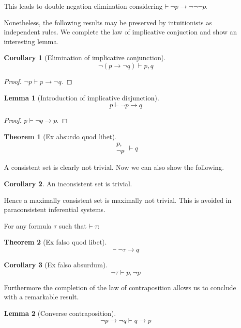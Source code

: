 \documentclass{amsbook}
\newcommand{\infers}{\mathrel\vdash}
\newcommand{\theorem}{\mathord\vdash\medspace}
\newcommand{\then}{\mathrel\rightarrow}
\theoremstyle{definition}
\newtheorem{thm}{Theorem}[section]
\newtheorem{lmm}{Lemma}[section]
\newtheorem{crl}{Corollary}[section]
\begin{document}
This leads to double negation elimination considering $\theorem \neg p \then \neg\neg\neg p$.

Nonetheless, the following results may be preserved by intuitionists as independent rules. We complete the law of implicative conjuction and show an interesting lemma.

\begin{crl}[Elimination of implicative conjunction]
    $$\neg(p \then \neg q) \infers p, q$$
    \begin{proof}
        $\neg p \infers p \then \neg q$.
    \end{proof}
\end{crl}

\begin{lmm}[Introduction of implicative disjunction]
    $$p \infers \neg p \then q$$
    \begin{proof}
        $p \infers \neg q \then p$.
    \end{proof}
\end{lmm}

\begin{thm}[Ex absurdo quod libet]
    $$\begin{aligned}
            p, \\ \neg p
        \end{aligned}\infers q$$
\end{thm}

A consistent set is clearly not trivial. Now we can also show the following.

\begin{crl}
    An inconsistent set is trivial.
\end{crl}

Hence a maximally consistent set is maximally not trivial. This is avoided in paraconsistent inferential systems.

For any formula $\tau$ such that $\theorem \tau$:

\begin{thm}[Ex falso quod libet]
    $$\theorem \neg\tau \then q$$
\end{thm}

\begin{crl}[Ex falso absurdum]
    $$\neg\tau \infers p, \neg p$$
\end{crl}

Furthermore the completion of the law of contraposition allows us to conclude with a remarkable result.

\begin{lmm}[Converse contraposition]
    $$\neg p \then \neg q \infers q \then p$$
\end{lmm}
\end{document}
